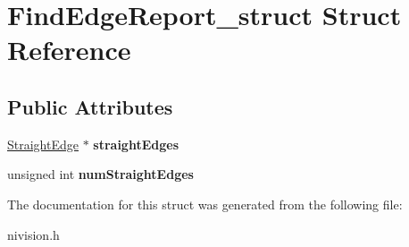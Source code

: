 \hypertarget{structFindEdgeReport__struct}{\section{\-Find\-Edge\-Report\-\_\-struct \-Struct \-Reference}
\label{structFindEdgeReport__struct}
}
\subsection*{\-Public \-Attributes}
\begin{DoxyCompactItemize}
\item 
\hypertarget{structFindEdgeReport__struct_a7be8c77d23e21997f2654bfe152a5e6d}{\hyperlink{structStraightEdge__struct}{\-Straight\-Edge} $\ast$ {\bfseries straight\-Edges}}\label{structFindEdgeReport__struct_a7be8c77d23e21997f2654bfe152a5e6d}

\item 
\hypertarget{structFindEdgeReport__struct_a2dda46c37ccc8c30ca18f0bf3925713c}{unsigned int {\bfseries num\-Straight\-Edges}}\label{structFindEdgeReport__struct_a2dda46c37ccc8c30ca18f0bf3925713c}

\end{DoxyCompactItemize}


\-The documentation for this struct was generated from the following file\-:\begin{DoxyCompactItemize}
\item 
nivision.\-h\end{DoxyCompactItemize}
